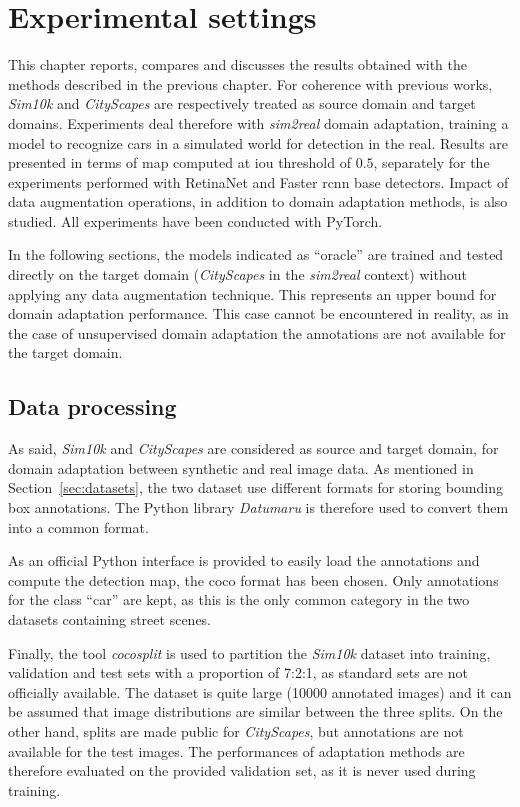 \documentclass[%
    corpo=12pt,
    twoside,
    stile=classica,   
    tipotesi=magistrale,
    evenboxes,
    english,
	numerazioneromana,
]{toptesi}
\newcommand{\quotes}[1]{``#1''}
\begin{document}
\section{Experimental settings}
This chapter reports, compares and discusses the results obtained with the methods described in the previous chapter. For coherence with previous works, \textit{Sim10k} and \textit{CityScapes} are respectively treated as source domain and target domains. Experiments deal therefore with \textit{sim2real} domain adaptation, training a model to recognize cars in a simulated world for detection in the real. Results are presented in terms of \gls{map} computed at \gls{iou} threshold of $ 0.5 $, separately for the experiments performed with RetinaNet and Faster \gls{rcnn} base detectors. Impact of data augmentation operations, in addition to domain adaptation methods, is also studied. All experiments have been conducted with PyTorch.

\bigskip
In the following sections, the models indicated as \quotes{oracle} are trained and tested directly on the target domain (\textit{CityScapes} in the \textit{sim2real} context) without applying any data augmentation technique. This represents an upper bound for domain adaptation performance. This case cannot be encountered in reality, as in the case of unsupervised domain adaptation the annotations are not available for the target domain.

\subsection{Data processing}
As said, \textit{Sim10k} and \textit{CityScapes} are considered as source and target domain, for domain adaptation between synthetic and real image data. As mentioned in Section~\ref{sec:datasets}, the two dataset use different formats for storing bounding box annotations. The Python library \textit{Datumaru}\cite{datumaro} is therefore used to convert them into a common format.

\medskip
As an official Python interface is provided to easily load the annotations and compute the detection \gls{map}, the \gls{coco} format has been chosen. Only annotations for the class \quotes{car} are kept, as this is the only common category in the two datasets containing street scenes.

\medskip
Finally, the tool \textit{cocosplit}\cite{cocosplit} is used to partition the \textit{Sim10k} dataset into training, validation and test sets with a proportion of 7\string:2\string:1, as standard sets are not officially available. The dataset is quite large (10000 annotated images) and it can be assumed that image distributions are similar between the three splits. On the other hand, splits are made public for \textit{CityScapes}, but annotations are not available for the test images. The performances of adaptation methods are therefore evaluated on the provided validation set, as it is never used during training.
\end{document}

